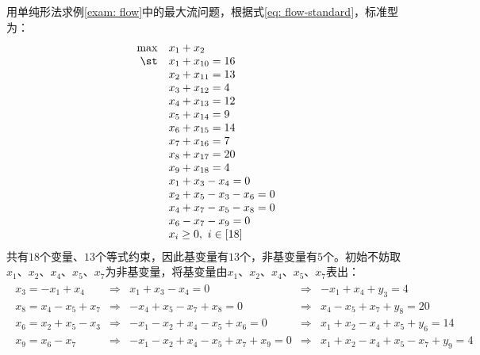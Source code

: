 \documentclass{ctexart}
\begin{document}
\begin{example}
    用单纯形法求例\ref{exam: flow}中的最大流问题，根据式\eqref{eq: flow-standard}，标准型为：
    \begin{align*}
        \begin{array}{rlcrl}
            \max & x_1 + x_2                 \\
            \st  & x_1 + x_{10} = 16         \\
                 & x_2 + x_{11} =  13        \\
                 & x_3 + x_{12} =  4         \\
                 & x_4 + x_{13} =  12        \\
                 & x_5 + x_{14} =  9         \\
                 & x_6 + x_{15} =  14        \\
                 & x_7 + x_{16} =  7         \\
                 & x_8 + x_{17} =  20        \\
                 & x_9 + x_{18} =  4         \\
                 & x_1 + x_3 - x_4 = 0       \\
                 & x_2 + x_5 - x_3 - x_6 = 0 \\
                 & x_4 + x_7 - x_5 - x_8 = 0 \\
                 & x_6 - x_7 - x_9 = 0       \\
                 & x_i \ge 0, ~ i \in [18]
        \end{array}
    \end{align*}
    共有$18$个变量、$13$个等式约束，因此基变量有$13$个，非基变量有$5$个。初始不妨取$x_1$、$x_2$、$x_4$、$x_5$、$x_7$为非基变量，将基变量由$x_1$、$x_2$、$x_4$、$x_5$、$x_7$表出：
    \begin{align*}
        \begin{array}{rclcl}
            x_3 = -x_1 + x_4      & \Rightarrow & x_1 + x_3 - x_4 = 0                    & \Rightarrow & -x_1 + x_4 + y_3 = 4                  \\
            x_8 = x_4 - x_5 + x_7 & \Rightarrow & -x_4 + x_5 - x_7 + x_8 = 0             & \Rightarrow & x_4 - x_5 + x_7 + y_8 = 20            \\
            x_6 = x_2 + x_5 - x_3 & \Rightarrow & -x_1 - x_2 + x_4 - x_5 + x_6 = 0       & \Rightarrow & x_1 + x_2 - x_4 + x_5 + y_6 = 14      \\
            x_9 = x_6 - x_7       & \Rightarrow & -x_1 - x_2 + x_4 - x_5 + x_7 + x_9 = 0 & \Rightarrow & x_1 + x_2 - x_4 + x_5 - x_7 + y_9 = 4 \\
        \end{array}
    \end{align*}


\end{example}
\end{document}
